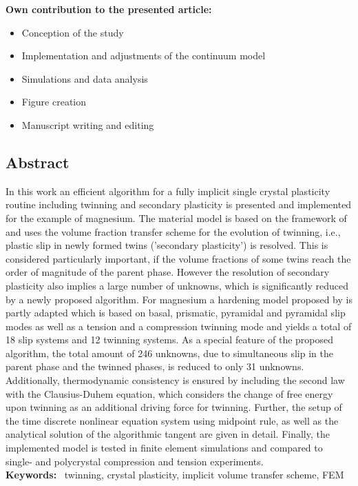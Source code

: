 \textbf{Own contribution to the presented article:}
\begin{itemize}
\item Conception of the study
\item Implementation and adjustments of the continuum model
\item Simulations and data analysis
\item Figure creation 
\item Manuscript writing and editing
\end{itemize}
\newpage

\subsection*{Abstract}
In this work an efficient algorithm for a fully implicit single crystal plasticity routine including twinning and secondary plasticity is presented and implemented for the example of magnesium. The material model is based on the framework of  and uses the volume fraction transfer scheme for the evolution of twinning, i.e., plastic slip in newly formed twins ('secondary plasticity') is resolved. This is considered particularly important, if the volume fractions of some twins reach the order of magnitude of the parent phase. However the resolution of secondary plasticity also implies a large number of unknowns, which is significantly reduced by a newly proposed algorithm. For magnesium a hardening model proposed by  is partly adapted which is based on basal, prismatic, pyramidal \pyra and pyramidal \pyrac slip modes as well as a tension and a compression twinning mode and yields a total of 18 slip systems and 12 twinning systems. As a special feature of the proposed algorithm, the total amount of 246 unknowns, due to simultaneous slip in the parent phase and the twinned phases, is reduced to only 31 unknowns. Additionally, thermodynamic consistency is ensured by including the second law with the Clausius-Duhem equation, which considers the change of free energy upon twinning as an additional driving force for twinning. Further, the setup of the time discrete nonlinear equation system using midpoint rule, as well as the analytical solution of the algorithmic tangent are given in detail. Finally, the implemented model is tested in finite element simulations and compared to single- and polycrystal compression and tension experiments. \\

\textbf{Keywords: }~twinning, crystal plasticity, implicit volume transfer scheme, FEM


